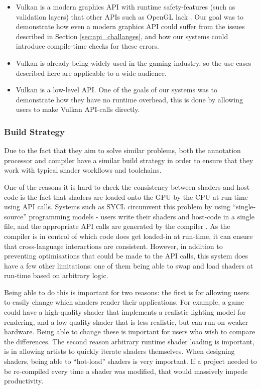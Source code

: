 \documentclass[a4paper,12pt,twoside,openright]{report}
\begin{document}
\begin{itemize}

    \item Vulkan is a modern graphics API with runtime safety-features (such as
    validation layers) that other APIs such as OpenGL lack \cite{TODO}. Our
    goal was to demonstrate how even a modern graphics API could suffer from
    the issues described in Section \ref{sec:api_challanges}, and how our
    systems could introduce compile-time checks for these errors.

    \item Vulkan is already being widely used in the gaming industry, so the
    use cases described here are applicable to a wide audience.

    \item Vulkan is a low-level API. One of the goals of our systems was to
    demonstrate how they have no runtime overhead, this is done by allowing
    users to make Vulkan API-calls directly.

\end{itemize}

\subsubsection{Build Strategy}

Due to the fact that they aim to solve similar problems, both the annotation
processor and compiler have a similar build strategy in order to ensure that
they work with typical shader workflows and toolchains.

One of the reasons it is hard to check the consistency between shaders and host
code is the fact that shaders are loaded onto the GPU by the CPU at run-time
using API calls. Systems such as SYCL circumvent this problem by using
``single-source'' programming models - users write their shaders and host-code
in a single file, and the appropriate API calls are generated by the compiler
\cite{TODO}. As the compiler is in control of which code does get loaded-in at
run-time, it can ensure that cross-language interactions are consistent.
However, in addition to preventing optimisations that could be made to the API
calls, this system does have a few other limitations: one of them being able to
swap and load shaders at run-time based on arbitrary logic.

Being able to do this is important for two reasons: the first is for allowing
users to easily change which shaders render their applications. For example, a
game could have a high-quality shader that implements a realistic lighting
model for rendering, and a low-quality shader that is less realistic, but can
run on weaker hardware. Being able to change these is important for users who
wish to compare the differences. The second reason arbitrary runtime shader
loading is important, is in allowing artists to quickly iterate shaders
themselves. When designing shaders, being able to ``hot-load'' shaders is very
important. If a project needed to be re-compiled every time a shader was
modified, that would massively impede productivity.
\end{document}

